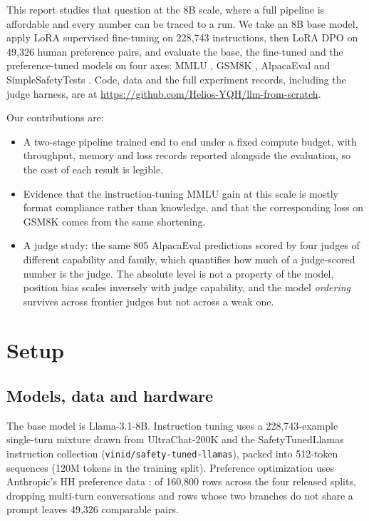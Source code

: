 \documentclass{article}
\begin{document}
This report studies that question at the 8B scale, where a full pipeline is
affordable and every number can be traced to a run. We take an 8B base model,
apply LoRA supervised fine-tuning on 228{,}743 instructions, then LoRA DPO on
49{,}326 human preference pairs, and evaluate the base, the fine-tuned and the
preference-tuned models on four axes: MMLU \citep{hendrycks2021mmlu}, GSM8K
\citep{cobbe2021gsm8k}, AlpacaEval \citep{li2023alpacaeval} and SimpleSafetyTests
\citep{vidgen2024sst}. Code, data and the full experiment records, including the
judge harness, are at \url{https://github.com/Helios-YQH/llm-from-scratch}.

Our contributions are:

\begin{itemize}
\item A two-stage pipeline trained end to end under a fixed compute budget, with
      throughput, memory and loss records reported alongside the evaluation, so
      the cost of each result is legible.
\item Evidence that the instruction-tuning MMLU gain at this scale is mostly
      format compliance rather than knowledge, and that the corresponding loss
      on GSM8K comes from the same shortening.
\item A judge study: the same 805 AlpacaEval predictions scored by four judges of
      different capability and family, which quantifies how much of a
      judge-scored number is the judge. The absolute level is not a property of
      the model, position bias scales inversely with judge capability, and the
      model \emph{ordering} survives
      across frontier judges but not across a weak one.
\end{itemize}

\section{Setup}

\subsection{Models, data and hardware}

The base model is Llama-3.1-8B. Instruction tuning uses a 228{,}743-example
single-turn mixture drawn from UltraChat-200K \citep{ding2023ultrachat} and the
SafetyTunedLlamas instruction collection (\texttt{vinid/safety-tuned-llamas}),
packed into 512-token sequences (120M tokens in
the training split). Preference optimization uses Anthropic's HH preference data
\citep{bai2022hh}: of 160{,}800 rows across the four released splits, dropping
multi-turn conversations and rows whose two branches do not share a prompt leaves
49{,}326 comparable pairs.
\end{document}
